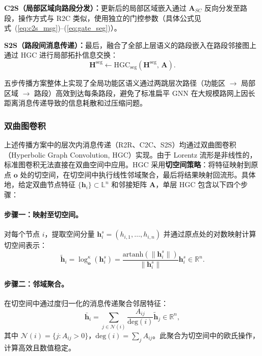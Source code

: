 \textbf{C2S（局部区域向路段分发）：}更新后的局部区域嵌入通过 $\mathbf{A}_{SC}$ 反向分发至路段，操作方式与 R2C 类似，使用独立的门控参数（具体公式见式~(\ref{eq:c2s_msg})--(\ref{eq:gate_seg})）。

\textbf{S2S（路段间消息传递）：}最后，融合了全部上层语义的路段嵌入在路段邻接图上通过 HGC 进行局部拓扑信息交换：
\begin{equation}
    \mathbf{H}^{\text{seg}} \leftarrow \text{HGC}_{\text{seg}}\!\left(\mathbf{H}^{\text{seg}},\, \mathbf{A}\right).
    \label{eq:s2s}
\end{equation}

五步传播方案整体上实现了全局功能区语义通过两跳层次路径（功能区 $\to$ 局部区域 $\to$ 路段）高效到达每条路段，避免了标准扁平 GNN 在大规模路网上因长距离消息传递导致的信息耗散和过压缩问题\cite{topping2022oversquashing}。

\subsubsection{双曲图卷积}

上述传播方案中的层次内消息传递（R2R、C2C、S2S）均通过双曲图卷积（Hyperbolic Graph Convolution, HGC）实现。由于 Lorentz 流形是非线性的，标准图卷积无法直接在双曲空间中应用。HGC\cite{chami2019hgcn,liu2019hgnn} 采用\textbf{切空间策略}：将特征映射到原点 $\mathbf{o}$ 处的切空间，在切空间中执行线性邻域聚合，最后将结果映射回流形。具体地，给定双曲节点特征 $\{\mathbf{h}_i\} \subset \mathbb{L}^n$ 和邻接矩阵 $\mathbf{A}$，单层 HGC 包含以下四个步骤：

\paragraph{步骤一：映射至切空间。} 对每个节点 $i$，提取空间分量 $\mathbf{h}_i^s = (h_{i,1}, \dots, h_{i,n})$ 并通过原点处的对数映射计算切空间表示：
\begin{equation}
    \tilde{\mathbf{h}}_i = \log_{\mathbf{o}}^{\kappa}(\mathbf{h}_i^s)
    = \frac{\text{artanh}(\|\mathbf{h}_i^s\|)}{\|\mathbf{h}_i^s\|} \mathbf{h}_i^s
    \in \mathbb{R}^{n}.
    \label{eq:hgc_log}
\end{equation}

\paragraph{步骤二：邻域聚合。} 在切空间中通过度归一化的消息传递聚合邻居特征：
\begin{equation}
    \bar{\mathbf{h}}_i = \sum_{j \in \mathcal{N}(i)} \frac{A_{ij}}{\text{deg}(i)} \tilde{\mathbf{h}}_j
    \in \mathbb{R}^{n},
    \label{eq:hgc_agg}
\end{equation}
其中 $\mathcal{N}(i) = \{j : A_{ij} > 0\}$，$\text{deg}(i) = \sum_j A_{ij}$。此聚合为切空间中的欧氏操作，计算高效且数值稳定。

